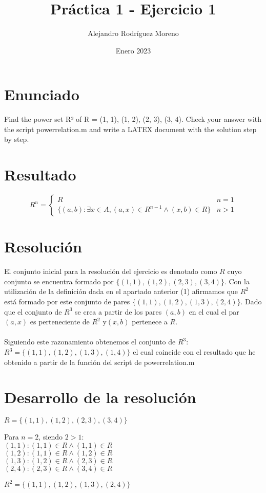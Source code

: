 \documentclass{article}
\title{Práctica 1 - Ejercicio 1}
\author{Alejandro Rodríguez Moreno}
\date{Enero 2023}
\begin{document}
\maketitle{}

\section*{Enunciado}
Find the power set R³ of R = {(1, 1), (1, 2), (2, 3), (3, 4)}. Check your answer with the script powerrelation.m and write a LATEX document with the
solution step by step.
\\
\section*{Resultado}
\begin{equation}
R^n =
    \begin{cases}
   
            R & n = 1
          \\  \{(a,b) : \exists x \in A, (a,x) \in R^{n-1} \wedge (x,b) \in R\} & n > 1
           
   
    \end{cases}
\end{equation}

\section*{Resolución}
El conjunto inicial para la resolución del ejercicio es denotado como $R$ cuyo conjunto se encuentra formado por $\lbrace{(1, 1),(1, 2),(2, 3),(3, 4)}\rbrace$. Con la utilización de la definición dada en el apartado anterior (1) afirmamos que $R^2$ está formado por este conjunto de pares $\lbrace{(1, 1),(1, 2),(1, 3),(2, 4)}\rbrace$. Dado que el conjunto de $R^3$ se crea a partir de los pares $(a,b)$ en el cual el par $(a,x)$ es perteneciente de $R^2$  y$(x,b)$ pertenece a $R $.
\\
\\
Siguiendo este razonamiento obtenemos el conjunto de $R^3$: $R^3 = \lbrace{(1,1),(1,2),(1,3),(1,4)}\rbrace$ el cual coincide con el resultado que he obtenido a partir de la función del script de powerrelation.m

\section*{Desarrollo de la resolución}
$R =\lbrace{(1, 1),(1, 2),(2, 3),(3, 4)}\rbrace$
\begin{center}
Para $n = 2$, siendo $2 > 1$:
\\
$(1,1) : (1,1) \in R \wedge (1,1) \in R$
\\$(1,2) : (1,1) \in R \wedge (1,2) \in R$
\\$(1,3) : (1,2) \in R \wedge (2,3) \in R$
\\$(2,4) : (2,3) \in R \wedge (3,4) \in R$
\end{center}
$R^2 = \lbrace{(1, 1),(1, 2),(1, 3),(2, 4)}\rbrace$
\\
\end{document}
